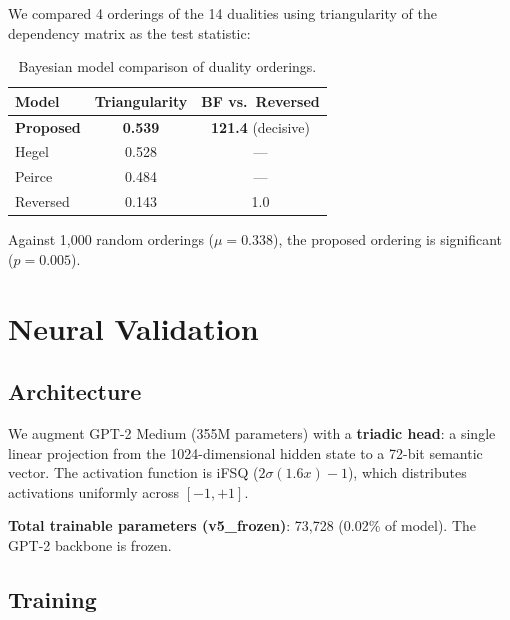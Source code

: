 \documentclass[11pt, a4paper]{article}
\begin{document}
We compared 4 orderings of the 14 dualities using triangularity of the dependency matrix as the test statistic:

\begin{table}[ht]
\centering
\small
\begin{tabular}{lcc}
\toprule
\textbf{Model} & \textbf{Triangularity} & \textbf{BF vs.\ Reversed} \\
\midrule
\textbf{Proposed} & \textbf{0.539} & \textbf{121.4} (decisive) \\
Hegel    & 0.528 & --- \\
Peirce   & 0.484 & --- \\
Reversed & 0.143 & 1.0 \\
\bottomrule
\end{tabular}
\caption{Bayesian model comparison of duality orderings.}
\label{tab:bayesian}
\end{table}

Against 1,000 random orderings ($\mu = 0.338$), the proposed ordering is significant ($p = 0.005$).

\section{Neural Validation}

\subsection{Architecture}

We augment GPT-2 Medium (355M parameters) with a \textbf{triadic head}: a single linear projection from the 1024-dimensional hidden state to a 72-bit semantic vector. The activation function is iFSQ ($2\sigma(1.6x) - 1$), which distributes activations uniformly across $[-1, +1]$.

\noindent\textbf{Total trainable parameters (v5\_frozen)}: 73,728 (0.02\% of model). The GPT-2 backbone is frozen.

\subsection{Training}
\end{document}
